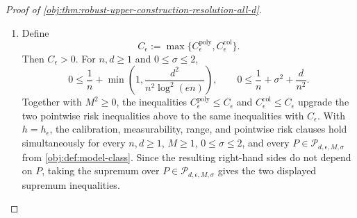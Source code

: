 \documentclass[11pt]{article}
\begin{document}
\begin{proof}[Proof of \cref{obj:thm:robust-upper-construction-resolution-all-d}]
\begin{enumerate}
\item Define
\[
C_{\epsilon}:=\max\{C_{\epsilon}^{\mathrm{poly}},
C_{\epsilon}^{\mathrm{col}}\}.
\]
Then \(C_{\epsilon}>0\).  For \(n,d\ge1\) and \(0\le\sigma\le2\),
\[
0\le
\frac1n+\min\!\left(1,\frac{d^2}{n^2\log^2(en)}\right),
\qquad
0\le
\frac1n+\sigma^2+\frac{d}{n^2}.
\]
Together with \(M^2\ge0\), the inequalities
\(C_{\epsilon}^{\mathrm{poly}}\le C_{\epsilon}\) and
\(C_{\epsilon}^{\mathrm{col}}\le C_{\epsilon}\) upgrade the two pointwise risk
inequalities above to the same inequalities with \(C_{\epsilon}\).  With
\(h=h_{\epsilon}\), the calibration, measurability, range, and pointwise risk
clauses hold simultaneously for every \(n,d\ge1\), \(M\ge1\),
\(0\le\sigma\le2\), and every \(P\in\mathcal P_{d,\epsilon,M,\sigma}\) from
\cref{obj:def:model-class}.  Since the resulting right-hand sides do not depend
on \(P\), taking the supremum over \(P\in\mathcal P_{d,\epsilon,M,\sigma}\)
gives the two displayed supremum inequalities.
\end{enumerate}
\end{proof}
\end{document}
